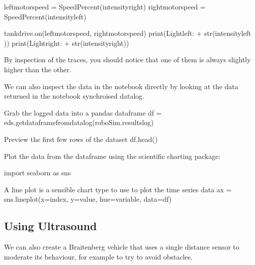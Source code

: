 \documentclass[letterpaper,10pt,english]{sphinxmanual}
\begin{document}
{{\begin{sphinxVerbatim}[commandchars=\\\{\}]
    left\PYGZus{}motor\PYGZus{}speed = SpeedPercent(intensity\PYGZus{}right)
    right\PYGZus{}motor\PYGZus{}speed = SpeedPercent(intensity\PYGZus{}left)

    tank\PYGZus{}drive.on(left\PYGZus{}motor\PYGZus{}speed, right\PYGZus{}motor\PYGZus{}speed)
    print(\PYGZsq{}Light\PYGZus{}left: \PYGZsq{} + str(intensity\PYGZus{}left ))
    print(\PYGZsq{}Light\PYGZus{}right: \PYGZsq{} + str(intensity\PYGZus{}right))
\end{sphinxVerbatim}
}

By inspection of the traces, you should notice that one of them is always slightly higher than the other.

We can also inspect the data in the notebook directly by looking at the data returned in the notebook synchroised datalog.

{
\begin{sphinxVerbatim}[commandchars=\\\{\}]
\llap{\color{nbsphinxin}[ ]:\,\hspace{\fboxrule}\hspace{\fboxsep}}\PYGZsh{}Grab the logged data into a pandas dataframe
df = eds.get\PYGZus{}dataframe\PYGZus{}from\PYGZus{}datalog(roboSim.results\PYGZus{}log)

\PYGZsh{}Preview the first few rows of the dataset
df.head()
\end{sphinxVerbatim}
}

Plot the data from the dataframe using the  scientific charting package:

{
\begin{sphinxVerbatim}[commandchars=\\\{\}]
\llap{\color{nbsphinxin}[ ]:\,\hspace{\fboxrule}\hspace{\fboxsep}}import seaborn as sns

\PYGZsh{} A line plot is a sensible chart type to use
\PYGZsh{} to plot the time series data
ax = sns.lineplot(x=\PYGZdq{}index\PYGZdq{},
                  y=\PYGZdq{}value\PYGZdq{},
                  hue=\PYGZsq{}variable\PYGZsq{},
                  data=df)
\end{sphinxVerbatim}
}


\subsection{Using Ultrasound}
\label{\detokenize{content/03_Robot_Lab/Section_00_03:Using-Ultrasound}}
We can also create a Braitenberg vehicle that uses a single distance sensor to moderate its behaviour, for example to try to avoid obstacles.

}
\end{document}
